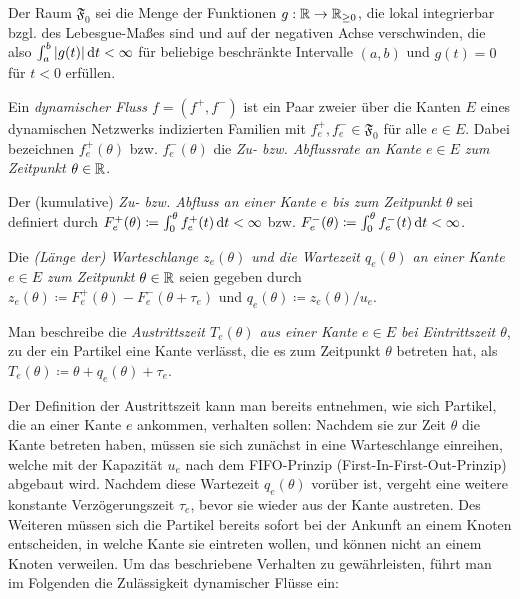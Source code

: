 \begin{definition}
	Der Raum $\mathfrak{F}_0$ sei die Menge der Funktionen $g: \mathbb{R} \to \mathbb{R}_{\geq 0}$, die lokal integrierbar bzgl. des Lebesgue-Maßes sind und auf der negativen Achse verschwinden, die also $\int_a^b |g(t)| \mathop{}\!\mathrm{d} t< \infty$ für beliebige beschränkte Intervalle $(a,b)$ und $g(t)=0$ für $t<0$ erfüllen.
\end{definition}

\begin{definition}
	Ein \emph{dynamischer Fluss $f=(f^+, f^-)$} ist ein Paar zweier über die Kanten $E$ eines dynamischen Netzwerks indizierten Familien mit $f^+_e,f^-_e\in\mathfrak F_0$ für alle $e\in E$.
	Dabei bezeichnen $f_e^+(\theta)$ bzw. $f_e^-(\theta)$ die \emph{Zu- bzw. Abflussrate an Kante $e\in E$ zum Zeitpunkt $\theta\in\mathbb{R}$}.
	
	Der (kumulative) \emph{Zu- bzw. Abfluss an einer Kante $e$ bis zum Zeitpunkt $\theta$} sei definiert durch $F^+_e(\theta)\coloneq\int_0^\theta f^+_e(t) \mathop{}\!\mathrm{d} t<\infty$ bzw. $F^-_e(\theta)\coloneq\int_0^\theta f^-_e(t) \mathop{}\!\mathrm{d} t<\infty$.
	
	Die \emph{(Länge der) Warteschlange $z_e(\theta)$ und die Wartezeit $q_e(\theta)$ an einer Kante $e\in E$ zum Zeitpunkt $\theta\in\mathbb{R}$} seien gegeben durch $z_e(\theta)\coloneq F_e^+(\theta) - F_e^-(\theta + \tau_e)$ und $q_e(\theta) \coloneq z_e(\theta) / u_e$.
	
	Man beschreibe die \emph{Austrittszeit $T_e(\theta)$ aus einer Kante $e\in E$ bei Eintrittszeit $\theta$}, zu der ein Partikel eine Kante verlässt, die es zum Zeitpunkt $\theta$ betreten hat, als $T_e(\theta)\coloneq\theta + q_e(\theta) + \tau_e$.
\end{definition}

Der Definition der Austrittszeit kann man bereits entnehmen, wie sich Partikel, die an einer Kante $e$ ankommen, verhalten sollen:
Nachdem sie zur Zeit $\theta$ die Kante betreten haben, müssen sie sich zunächst in eine Warteschlange einreihen, welche mit der Kapazität $u_e$ nach dem FIFO-Prinzip (First-In-First-Out-Prinzip) abgebaut wird.
Nachdem diese Wartezeit $q_e(\theta)$ vorüber ist, vergeht eine weitere konstante Verzögerungszeit $\tau_e$, bevor sie wieder aus der Kante austreten.
Des Weiteren müssen sich die Partikel bereits sofort bei der Ankunft an einem Knoten entscheiden, in welche Kante sie eintreten wollen, und können nicht an einem Knoten verweilen.
Um das beschriebene Verhalten zu gewährleisten, führt man im Folgenden die Zulässigkeit dynamischer Flüsse ein:

